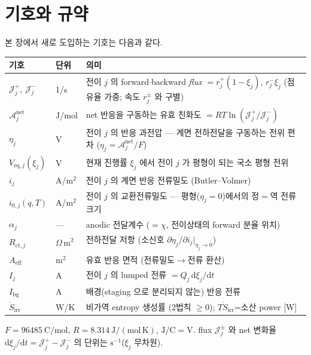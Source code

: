 \documentclass[11pt,a4paper]{article}
\newcommand{\dd}{\mathrm{d}}
\newcommand{\eff}{\mathrm{eff}}
\newcommand{\eq}{\mathrm{eq}}
\newcommand{\bg}{\mathrm{bg}}
\newcommand{\ct}{\mathrm{ct}}
\newcommand{\irr}{\mathrm{irr}}
\begin{document}
\section{기호와 규약}\label{sec:nch2_notation}
본 장에서 새로 도입하는 기호는 다음과 같다.
\begin{longtable}{p{} p{} >{\raggedright\arraybackslash}p{}}
\toprule 기호 & 단위 & 의미 \\ \midrule \endhead
$\mathcal J_j^+,\ \mathcal J_j^-$ & 1/s & 전이 $j$ 의 forward$\cdot$backward \emph{flux} $=r_j^+(1-\xi_j)$, $r_j^-\xi_j$ (점유율 가중; 속도 $r_j^\pm$ 와 구별) \\
$\mathcal A_j^{\mathrm{net}}$ & J/mol & net 반응을 구동하는 유효 친화도 $=RT\ln(\mathcal J_j^+/\mathcal J_j^-)$ \\
$\eta_j$ & V & 전이 $j$ 의 반응 과전압 — 계면 전하전달을 구동하는 전위 편차 ($\eta_j=\mathcal A_j^{\mathrm{net}}/F$) \\
$V_{\eq,j}(\xi_j)$ & V & 현재 진행률 $\xi_j$ 에서 전이 $j$ 가 평형이 되는 국소 평형 전위 \\
$i_j$ & A/m$^2$ & 전이 $j$ 의 계면 반응 전류밀도 (Butler--Volmer) \\
$i_{0,j}(q,T)$ & A/m$^2$ & 전이 $j$ 의 교환전류밀도 — 평형($\eta_j=0$)에서의 정$=$역 전류 크기 \\
$\alpha_j$ & --- & anodic 전달계수 ($=\chi$, 전이상태의 forward 분율 위치) \\
$R_{\ct,j}$ & $\Omega\,\mathrm{m^2}$ & 전하전달 저항 (소신호 $\partial\eta_j/\partial i_j|_{\eta_j\to0}$) \\
$A_\eff$ & m$^2$ & 유효 반응 면적 (전류밀도$\to$전류 환산) \\
$I_j$ & A & 전이 $j$ 의 lumped 전류 $=Q_j\,\dd\xi_j/\dd t$ \\
$I_\bg$ & A & 배경(staging 으로 분리되지 않는) 반응 전류 \\
$\dot S_{\irr}$ & W/K & 비가역 entropy 생성률 (2법칙 $\ge0$); $T\dot S_\irr$=소산 power [W] \\
\bottomrule
\end{longtable}
$F=96485\ \mathrm{C/mol}$, $R=8.314\ \mathrm{J/(mol\,K)}$, $\mathrm{J/C}=\mathrm V$. flux $\mathcal J_j^\pm$ 와
net 변화율 $\dd\xi_j/\dd t=\mathcal J_j^+-\mathcal J_j^-$ 의 단위는 $\mathrm{s^{-1}}$($\xi_j$ 무차원).

\end{document}
